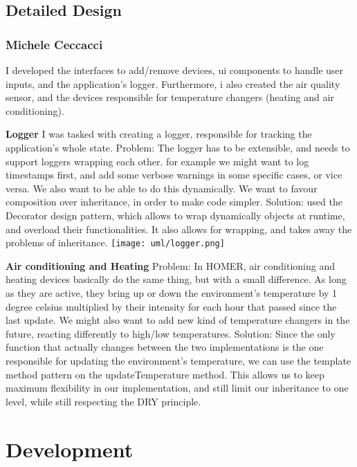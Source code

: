 \documentclass[a4paper,12pt]{report}
\begin{document}
\section{Detailed Design}
\subsection{Michele Ceccacci}
I developed the interfaces to add/remove devices, ui components to handle user inputs,
and the application's logger. Furthermore, i also created the air quality sensor,
and the devices responsible for temperature changers (heating and air conditioning).

\textbf{Logger} \newline
I was tasked with creating a logger, responsible for tracking 
the application's whole state. 
Problem: The logger has to be extensible, and needs to support loggers wrapping each other.
for example we might want to log timestamps first, and add some verbose warnings in some specific cases,
or vice versa.
We also want to be able to do this dynamically. We want to favour composition over inheritance, in order to make code simpler.
Solution: used the Decorator design pattern, which allows to wrap dynamically objects at runtime,
and overload their functionalities. It also allows for wrapping, and takes away the problems of inheritance. \newline
\texttt{[image: uml/logger.png]}

\textbf{Air conditioning and Heating}\newline
Problem: In HOMER, air conditioning and heating devices basically do the same thing, but with a small difference. As long as they are
active, they bring up or down the environment's temperature by 1 degree celsius multiplied by their intensity for each hour that passed
since the last update.
We might also want to add new kind of temperature changers in the future, reacting differently to high/low temperatures.
Solution: Since the only function that actually changes between the two implementations is the one responsible for updating the
environment's temperature, we can use the template method pattern on the updateTemperature method. This allows us to keep maximum
flexibility in our implementation, and still limit our inheritance to one level, while still respecting the DRY principle.


\chapter{Development}
\end{document}
